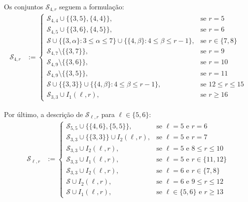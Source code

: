 \documentclass[12pt,a4paper]{book}
\begin{document}
Os conjuntos $\mathcal{S}_{4, r}$ seguem a formulação:
\begin{equation*}%
    \begin{aligned}
        \mathcal{S}_{4, r}
            &:=
  \begin{cases}
  \mathcal{S}_{4,4} \cup \{\{3,5\}, \{4,4\}\}, 
        & \text{se }  r=5      \\ 
         \mathcal{S}_{4,5} \cup \{\{3,6\}, \{4,5\}\}, 
        & \text{se }  r=6      \\ 
         \mathcal{S} \cup \{\{3,\alpha\}: 3\leq\alpha\leq7\}\cup \{\{4,\beta\}: 4\leq \beta\leq r-1\}, 
        & \text{se }  r\in\{7,8\}      \\ 
        \mathcal{S}_{4,7} \setminus\{\{3,7\}\}, 
        & \text{se }  r=9      \\ 
         \mathcal{S}_{4,9} \setminus\{\{3,6\}\}, 
        & \text{se }  r=10      \\ 
         \mathcal{S}_{4,9} \setminus\{\{3,5\}\}, 
        & \text{se }  r=11      \\ 
         \mathcal{S} \cup \{\{3,3\}\} \cup \{\{4,\beta\}: 4\leq \beta\leq r-1\}, 
        & \text{se }  12\leq r\leq 15     \\ 
         \mathcal{S}_{3,3} \cup I_1(\ell,r),  & \text{se }  r \geq 16  
	\end{cases}
    \end{aligned}  
\end{equation*}

Por último, a descrição de $\mathcal{S}_{\ell, r}$ para $\ell \in \{5,6\}$:
\begin{equation*}%
    \begin{aligned}
        \mathcal{S}_{\ell, r}
            &:=
    \begin{cases}
        \mathcal{S}_{5,5} \cup \{\{4,6\}, \{5,5\}\}, 
        & \text{se } \ell=5 \text{ e } r=6     \\
         \mathcal{S}_{3,3} \cup \{\{3,3\}\}\cup I_2(\ell,r), 
        & \text{se } \ell=5 \text{ e } r=7    \\
         \mathcal{S}_{3,3} \cup I_2(\ell,r), 
        & \text{se } \ell=5 \text{ e } 8\leq r\leq 10    \\
         \mathcal{S}_{3,3} \cup I_1(\ell,r), 
        & \text{se } \ell=5 \text{ e } r\in \{11,12\}    \\
         \mathcal{S}_{3,3} \cup I_2(\ell,r),  & \text{se } \ell=6 \text{ e } r \in\{7,8\}  \\
        \mathcal{S} \cup I_2(\ell,r),  & \text{se } \ell=6 \text{ e }  9\leq r \leq 12 \\
        \mathcal{S} \cup I_1(\ell,r),  & \text{se } \ell \in\{5,6\} \text{ e } r \geq 13         
        \end{cases}
    \end{aligned}  
\end{equation*}



\backmatter \singlespacing   %
\end{document}
